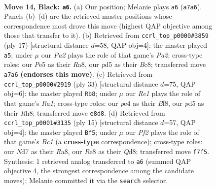 \documentclass[11pt]{article}
\begin{document}
\clearpage

\begin{figure}[p]\centering
\begin{subfigure}{0.46\textwidth}\centering
\resizebox{\linewidth}{!}{%
\newchessgame
\chessboard[
  setfen={r1b1r1k1/ppqn1pbp/6p1/2pPp1B1/2B1P3/2P5/P4PPP/R1Q1K1NR b - - 5 14},
  showmover=false,
  pgfstyle=straightmove, color=movearrow, markmove={a7-a6}
]}
\caption{}
\end{subfigure}\hfill
\begin{subfigure}{0.46\textwidth}\centering
\resizebox{\linewidth}{!}{%
\newchessgame
\chessboard[
  setfen={r1bqk2r/p1ppnppp/1bp5/8/PP2P3/2PB4/5PPP/RNBQK2R b KQkq - 0 9},
  showmover=false,
  pgfstyle=straightmove, color=movearrow, markmove={a7-a5}
]}
\caption{}
\end{subfigure}
\\[4pt]
\begin{subfigure}{0.46\textwidth}\centering
\resizebox{\linewidth}{!}{%
\newchessgame
\chessboard[
  setfen={r3kb1r/1p1n1pp1/p2p1q2/N2Ppb1p/2P5/4BPP1/PP1QB2P/R3K2R b KQk - 4 17},
  showmover=false,
  pgfstyle=straightmove, color=movearrow, markmove={a8-b8}
]}
\caption{}
\end{subfigure}\hfill
\begin{subfigure}{0.46\textwidth}\centering
\resizebox{\linewidth}{!}{%
\newchessgame
\chessboard[
  setfen={r1bqkb1r/pp2pppp/2p5/3nP3/3P4/8/PPP1B1PP/RNBQK2R b KQkq - 0 8},
  showmover=false,
  pgfstyle=straightmove, color=movearrow, markmove={c8-f5}
]}
\caption{}
\end{subfigure}
\caption{\textbf{Move 14, Black: \texttt{a6}.} (a) Our position; Melanie plays \texttt{a6} (\texttt{a7a6}). Panels (b)--(d) are the retrieved master positions whose correspondence most drove this move (highest QAP objective among those that transfer to it). (b) Retrieved from \texttt{ccrl\_top\_p0000\#3859} (ply 17) [structural distance $d$=58, QAP obj=4]: the master played \texttt{a5}; under $\mu$ our \emph{Pa2} plays the role of that game's \emph{Pa2}; cross-type roles: our \emph{P}e5 as their \emph{R}a8, our \emph{p}d5 as their \emph{B}c8; transferred move \texttt{a7a6} \textbf{(endorses this move)}. (c) Retrieved from \texttt{ccrl\_top\_p0000\#2919} (ply 33) [structural distance $d$=75, QAP obj=6]: the master played \texttt{Rb8}; under $\mu$ our \emph{Re1} plays the role of that game's \emph{Ra1}; cross-type roles: our \emph{p}e4 as their \emph{B}f8, our \emph{p}d5 as their \emph{R}h8; transferred move \texttt{e8d8}. (d) Retrieved from \texttt{ccrl\_top\_p0001\#3135} (ply 15) [structural distance $d$=57, QAP obj=4]: the master played \texttt{Bf5}; under $\mu$ our \emph{Pf2} plays the role of that game's \emph{Bc1} (a \textbf{cross-type} correspondence); cross-type roles: our \emph{N}d7 as their \emph{R}a8, our \emph{R}e8 as their \emph{Q}d8; transferred move \texttt{f7f5}. Synthesis: 1 retrieved analog transferred to \texttt{a6} (summed QAP objective 4, the strongest correspondence among the candidate moves); Melanie committed it via the \texttt{search} selector.}
\label{fig:thought-m27}
\end{figure}
\end{document}
